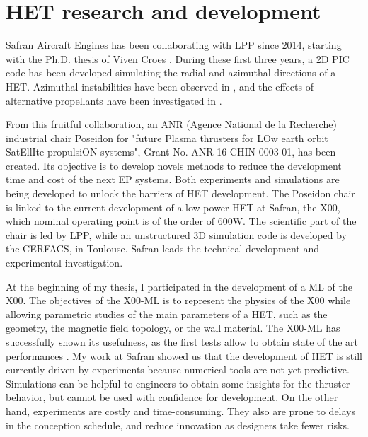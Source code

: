 

\section*{\acs{HET} research and development}
\label{sec-poseidon}

Safran Aircraft Engines has been collaborating with \ac{LPP} since 2014, starting with the Ph.D. thesis of Viven Croes \citep{croes2017}.
During these first three years, a \ac{2D} \ac{PIC} code has been developed simulating the radial and azimuthal directions of a \ac{HET}.
Azimuthal instabilities have been observed in \citet{croes2017a}, and the effects of alternative propellants have been investigated in \citet{croes2018}.

From this fruitful collaboration, an ANR (Agence National de la Recherche) industrial chair {\sc Poseidon} for  "future Plasma thrusters for LOw earth orbit SatEllIte propulsiON systems", Grant No. ANR-16-CHIN-0003-01, has been created.
Its objective is to develop novels methods to reduce the development time and cost of the next \ac{EP} systems.
Both experiments and simulations are being developed to unlock the barriers of \ac{HET} development.
The {\sc Poseidon} chair is linked to the current development of a  low power \ac{HET} at Safran, the \PPS X00, which nominal operating point is of the order of 600W.
The scientific part of the chair is led by \ac{LPP}, while an unstructured \ac{3D} simulation code is developed by the CERFACS, in Toulouse.
Safran leads the technical development and experimental investigation.

At the beginning of my thesis, I participated in the development of a \ac{ML} of the \PPS X00.
The objectives of the \PPS X00-\ac{ML}  is to represent the physics of the \PPS X00 while allowing parametric studies of the main parameters of a \ac{HET}, such as the geometry, the magnetic field topology, or the wall material.
The \PPS X00-\ac{ML} has successfully shown its usefulness, as the first tests allow to obtain state of the art performances \citep{vaudolon2018}.
My work at Safran showed us that the development of \ac{HET} is still currently driven by experiments because numerical tools are not yet predictive.
Simulations can be helpful to engineers to obtain some insights for the thruster behavior, but cannot be used with confidence for development.
On the other hand, experiments are costly and time-consuming.
They also are prone to delays in the conception schedule, and reduce innovation as designers take fewer risks.

